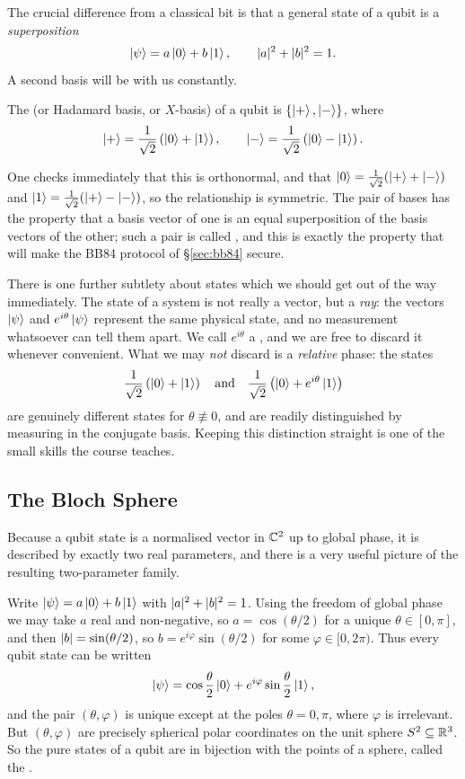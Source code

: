 \documentclass[a4paper]{scrartcl}
\begin{document}
The crucial difference from a classical bit is that a general state of a qubit is a \emph{superposition}
$$\ket{\psi} = a\ket{0} + b\ket{1}, \qquad \lvert a\rvert^2 + \lvert b\rvert^2 = 1.$$
A second basis will be with us constantly.

\begin{definition}
	The  (or Hadamard basis, or $X$-basis) of a qubit is $\{\ket{+}, \ket{-}\}$, where
	$$\ket{+} = \frac{1}{\sqrt{2}}\left(\ket{0} + \ket{1}\right), \qquad \ket{-} = \frac{1}{\sqrt{2}}\left(\ket{0} - \ket{1}\right).$$
\end{definition}

One checks immediately that this is orthonormal, and that $\ket{0} = \tfrac{1}{\sqrt2}(\ket{+} + \ket{-})$ and $\ket{1} = \tfrac{1}{\sqrt2}(\ket{+} - \ket{-})$, so the relationship is symmetric. The pair of bases has the property that a basis vector of one is an equal superposition of the basis vectors of the other; such a pair is called , and this is exactly the property that will make the BB84 protocol of \S\ref{sec:bb84} secure.

There is one further subtlety about states which we should get out of the way immediately. The state of a system is not really a vector, but a \emph{ray}: the vectors $\ket{\psi}$ and $e^{i\theta}\ket{\psi}$ represent the same physical state, and no measurement whatsoever can tell them apart. We call $e^{i\theta}$ a , and we are free to discard it whenever convenient. What we may \emph{not} discard is a \emph{relative} phase: the states
$$\frac{1}{\sqrt2}\left(\ket{0} + \ket{1}\right) \quad\text{and}\quad \frac{1}{\sqrt2}\left(\ket{0} + e^{i\theta}\ket{1}\right)$$
are genuinely different states for $\theta \not\equiv 0$, and are readily distinguished by measuring in the conjugate basis. Keeping this distinction straight is one of the small skills the course teaches.

\subsection{The Bloch Sphere}\label{sec:bloch}

Because a qubit state is a normalised vector in $\mathbb{C}^2$ up to global phase, it is described by exactly two real parameters, and there is a very useful picture of the resulting two-parameter family.

Write $\ket{\psi} = a \ket{0} + b\ket{1}$ with $\lvert a\rvert^2 + \lvert b\rvert^2 = 1$. Using the freedom of global phase we may take $a$ real and non-negative, so $a = \cos(\theta/2)$ for a unique $\theta \in [0,\pi]$, and then $\lvert b\rvert = \sin(\theta/2)$, so $b = e^{i\varphi}\sin(\theta/2)$ for some $\varphi \in [0, 2\pi)$. Thus every qubit state can be written
$$\ket{\psi} = \cos\frac{\theta}{2}\ket{0} + e^{i\varphi}\sin\frac{\theta}{2}\ket{1},$$
and the pair $(\theta, \varphi)$ is unique except at the poles $\theta = 0, \pi$, where $\varphi$ is irrelevant. But $(\theta,\varphi)$ are precisely spherical polar coordinates on the unit sphere $S^2 \subseteq \mathbb{R}^3$. So the pure states of a qubit are in bijection with the points of a sphere, called the .
\end{document}
